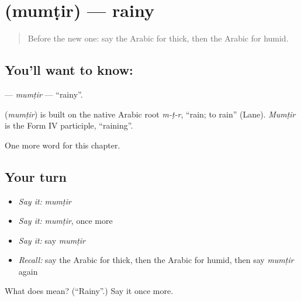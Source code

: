\section[\texorpdfstring{\ar{ممطر} (mumṭir)}{ممطر (mumṭir)}]{ (mumṭir) — rainy}

\label{lesson:AR-C179-mumtir}



\begin{quote}
Before the new one: say the Arabic for thick, then the Arabic for humid.
\end{quote}

\subsection*{You'll want to know: }
\textbf{} — \emph{mumṭir} — \textquotedblleft{}rainy\textquotedblright{}.

\begin{cousinweb}
\textbf{} (\emph{mumṭir}) is built on the native Arabic root \emph{m-ṭ-r}, \textquotedblleft{}rain; to rain\textquotedblright{} (Lane). \emph{Mumṭir} is the Form IV participle, \textquotedblleft{}raining\textquotedblright{}.
\end{cousinweb}

\begin{grammarlens}[title={What you've built}]
One more word for this chapter.
\end{grammarlens}

\subsection*{Your turn}
\begin{itemize}
\raggedright
  \item \emph{Say it:} \emph{mumṭir}
  \item \emph{Say it:} \emph{mumṭir}, once more
  \item \emph{Say it:} say \emph{mumṭir}
  \item \emph{Recall:} say the Arabic for thick, then the Arabic for humid, then say \emph{mumṭir} again
\end{itemize}

\begin{tcolorbox}[breakable,colback=teal!4,colframe=teal!35!black,title={Before you move on}]
What does  mean? (\textquotedblleft{}Rainy\textquotedblright{}.) Say it once more.
\end{tcolorbox}
